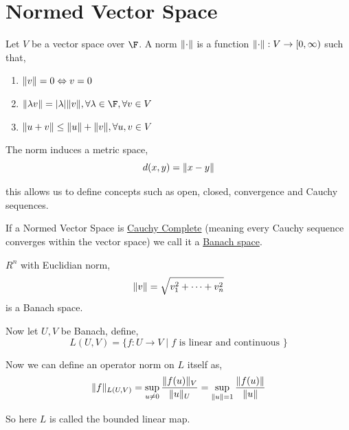 \section{Normed Vector Space}

Let $V$ be a vector space over $\F$. A norm $\lVert\cdot\rVert$ is a function $\lVert\cdot\rVert: V \to [0,  \infty)$ such that, 
\begin{enumerate}
  \item $\lVert v\rVert = 0 \Leftrightarrow v = 0$
  \item $\norm{\lambda v} = |\lambda| \norm{v}, \forall \lambda \in \F, \forall v \in V$
  \item $\lVert u + v\rVert \le \lVert u\rVert + \lVert v\rVert, \forall u, v \in V$
\end{enumerate}

The norm induces a metric space, 
\[
  d(x, y) = \lVert x - y\rVert
\]

this allows us to define concepts such as open, closed, convergence and Cauchy sequences.
\vspace{1em}

If a Normed Vector Space is \underline{Cauchy Complete} (meaning every Cauchy sequence converges within the vector space) we call it a \underline{Banach space}.

\begin{eg}
  $R^{n}$ with Euclidian norm, 
  \[
    \lVert v\rVert = \sqrt{v_{1}^2 + \dots + v_n^2}
  \]
  is a Banach space.
\end{eg}

Now let $U, V$ be Banach, define, 
\[
  L(U, V) = \{f: U \to V \mid f \text{ is linear and continuous }\}
\]


Now we can define an operator norm on $L$ itself as, 
\[
  \lVert f\rVert_{L(U,V)} = \sup_{u \ne 0} \frac{\lVert f(u)\rVert_V}{\lVert u\rVert_U} = \sup_{\lVert u\rVert = 1} \frac{\lVert f(u)\rVert}{\lVert u\rVert} 
\]

So here $L$ is called the bounded linear map.


\vspace{1em}

